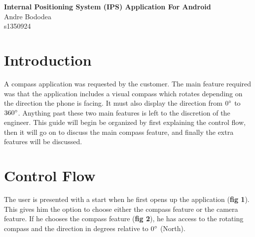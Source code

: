 \documentclass[12pt]{article}
\begin{document}



\begingroup  
  \centering
  \LARGE \textbf{Internal Positioning System (IPS) Application For Android\\[0.4em]}
  \large Andre Bododea \\[0.2em]
  \large s1350924 \par

\endgroup


\section*{Introduction}

\cite{kaemarungsi2004modeling}

A compass application was requested by the customer. The main feature required was that the application includes a visual compass which rotates depending on the direction the phone is facing. It must also display the direction from $0\degree$ to $360\degree$. Anything past these two main features is left to the discretion of the engineer. This guide will begin be organized by first explaining the control flow, then it will go on to discuss the main compass feature, and finally the extra features will be discussed.

\section*{Control Flow}

The user is presented with a start when he first opens up the application (\textbf{fig 1}). This gives him the option to choose either the compass feature or the camera feature. If he chooses the compass feature (\textbf{fig 2}), he has access to the rotating compass and the direction in degrees relative to $0\degree$ (North).
\end{document}
